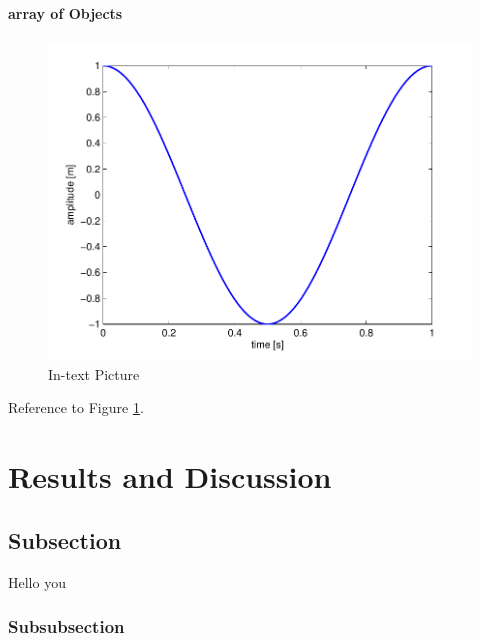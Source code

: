 \documentclass[fleqn,10pt]{SelfArx} %
\begin{document}
\paragraph{array of Objects}



\begin{figure}[ht]\centering
\includegraphics[width=\linewidth]{results}
\caption{In-text Picture}
\label{fig:results}
\end{figure}

Reference to Figure \ref{fig:results}.


\section{Results and Discussion}

\lipsum[10] %

\subsection{Subsection}

\lipsum[11] %

\begin{table}[hbt]
\centering
Hello you
\label{tab:label}
\end{table}

\subsubsection{Subsubsection}
\end{document}
